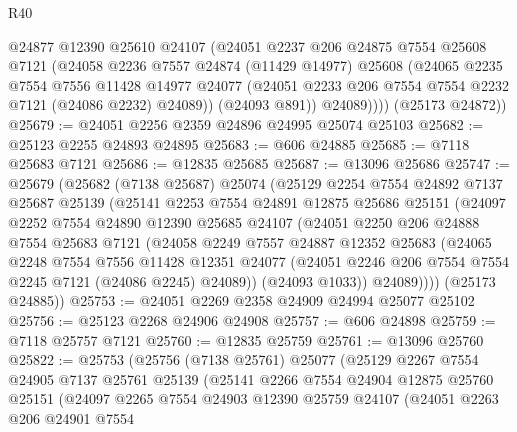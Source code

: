 \begin{lexlean}{R40}
\begin{coremodule}
            @24877
            @12390
            @25610
            @24107
            (@24051
              @2237
              @206
              @24875
              @7554
              @25608
              @7121
              (@24058
                @2236
                @7557
                @24874
                (@11429 @14977)
                @25608
                (@24065
                  @2235
                  @7554
                  @7556
                  @11428
                  @14977
                  @24077
                  (@24051 @2233 @206 @7554 @7554 @2232 @7121 (@24086 @2232) @24089))
                (@24093 @891))
              @24089))))
      (@25173 @24872))
@25679 := @24051 @2256 @2359 @24896 @24995 @25074 @25103
@25682 := @25123 @2255 @24893 @24895
@25683 := @606 @24885
@25685 := @7118 @25683 @7121
@25686 := @12835 @25685
@25687 := @13096 @25686
@25747 := @25679
    (@25682
      (@7138 @25687)
      @25074
      (@25129
        @2254
        @7554
        @24892
        @7137
        @25687
        @25139
        (@25141
          @2253
          @7554
          @24891
          @12875
          @25686
          @25151
          (@24097
            @2252
            @7554
            @24890
            @12390
            @25685
            @24107
            (@24051
              @2250
              @206
              @24888
              @7554
              @25683
              @7121
              (@24058
                @2249
                @7557
                @24887
                @12352
                @25683
                (@24065
                  @2248
                  @7554
                  @7556
                  @11428
                  @12351
                  @24077
                  (@24051 @2246 @206 @7554 @7554 @2245 @7121 (@24086 @2245) @24089))
                (@24093 @1033))
              @24089))))
      (@25173 @24885))
@25753 := @24051 @2269 @2358 @24909 @24994 @25077 @25102
@25756 := @25123 @2268 @24906 @24908
@25757 := @606 @24898
@25759 := @7118 @25757 @7121
@25760 := @12835 @25759
@25761 := @13096 @25760
@25822 := @25753
    (@25756
      (@7138 @25761)
      @25077
      (@25129
        @2267
        @7554
        @24905
        @7137
        @25761
        @25139
        (@25141
          @2266
          @7554
          @24904
          @12875
          @25760
          @25151
          (@24097
            @2265
            @7554
            @24903
            @12390
            @25759
            @24107
            (@24051
              @2263
              @206
              @24901
              @7554

\end{coremodule}
\end{lexlean}
